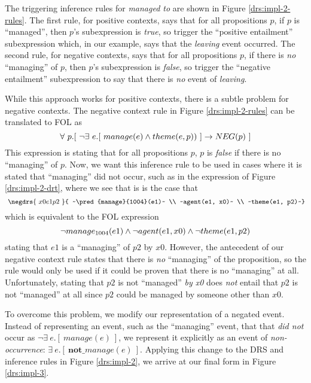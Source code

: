 The triggering inference rules for {\it managed to} are shown in Figure
\ref{drs:impl-2-rules}.  The first rule, for positive contexts, says that for
all propositions $p$, if $p$ is ``managed'', then $p$'s subexpression is {\it
true}, so trigger the ``positive entailment'' subexpression which, in our
example, says that the {\it leaving} event occurred.  The second rule, for
negative contexts, says that for all propositions $p$, if there is {\it no}
``managing'' of $p$, then $p$'s subexpression is {\it false}, so trigger the
``negative entailment'' subexpression to say that there is {\it no} event of
{\it leaving}.

While this approach works for positive contexts, there is a subtle problem for
negative contexts.  The negative context rule in Figure \ref{drs:impl-2-rules}
can be translated to FOL as \[ \forall~ p.[~ \lnot \exists~ e.[~ manage(e) \land
theme(e,p)) ~] \to \NEG{p} ~] \] This expression is stating that for all
propositions $p$, $p$ is {\it false} if there is no ``managing'' of $p$.  Now,
we want this inference rule to be used in cases where it is stated that
``managing'' did not occur, such as in the expression of Figure
\ref{drs:impl-2-drt}, where we see that is is the case that \[ ~\negdrs{~x0 e1
p2~}{ ~\pred{manage}{1004}(e1)~ \\ ~agent(e1, x0)~ \\ ~theme(e1, p2)~} \] which is
equivalent to the FOL expression \[ \lnot manage_{1004}(e1) \land \lnot
agent(e1, x0) \land \lnot theme(e1, p2) \] stating that $e1$ is a ``managing''
of $p2$ by $x0$.  However, the antecedent of our negative context rule states
that there is {\it no} ``managing'' of the proposition, so the rule would only
be used if it could be proven that there is no ``managing'' at all.
Unfortunately, stating that $p2$ is not ``managed'' {\it by x0} does {\it not}
entail that $p2$ is not ``managed'' at all since $p2$ could be managed by
someone other than $x0$.

To overcome this problem, we modify our representation of a negated event. 
Instead of representing an event, such as the ``managing'' event, that that
{\it did not} occur as $\lnot \exists~ e.[~ manage(e) ~]$, we represent it
explicitly as an event of {\it non-occurrence}: $\exists~ e.[~
\textbf{not\_}manage(e) ~]$.  Applying this change to the DRS and inference
rules in Figure \ref{drs:impl-2}, we arrive at our final form in Figure
\ref{drs:impl-3}.

